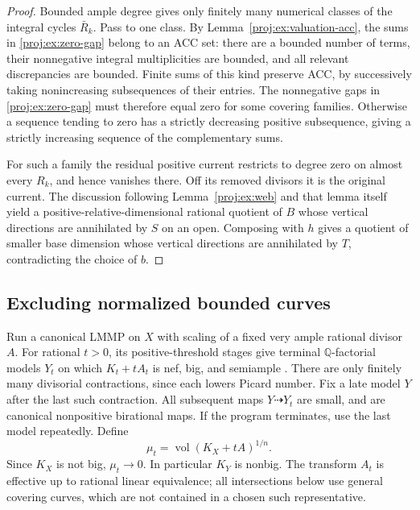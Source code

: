 \documentclass[11pt,letterpaper]{article}
\theoremstyle{definition}
\theoremstyle{remark}
\begin{document}
\begin{proof}
Bounded ample degree gives only finitely many numerical
classes of the integral cycles \(\bar R_k\). Pass to one
class. By Lemma~\ref{proj:ex:valuation-acc}, the sums in
\eqref{proj:ex:zero-gap} belong to an ACC set: there are a bounded
number of terms, their nonnegative integral multiplicities
are bounded, and all relevant discrepancies are bounded.
Finite sums of this kind preserve ACC, by successively
taking nonincreasing subsequences of their entries.
The nonnegative gaps in \eqref{proj:ex:zero-gap} must therefore
equal zero for some covering families. Otherwise a sequence
tending to zero has a strictly decreasing positive
subsequence, giving a strictly increasing sequence of the
complementary sums.

For such a family the residual positive current restricts
to degree zero on almost every \(R_k\), and hence vanishes
there. Off its removed divisors it is the original current.
The discussion following Lemma~\ref{proj:ex:web} and that lemma
itself yield a positive-relative-dimensional rational
quotient of \(B\) whose vertical directions are annihilated
by \(S\) on an open. Composing with \(h\) gives a quotient
of smaller base dimension whose vertical directions are
annihilated by \(T\), contradicting the choice of \(b\).
\end{proof}

\subsection{Excluding normalized bounded curves}

Run a canonical LMMP on \(X\) with scaling of a fixed very ample
rational divisor \(A\). For rational \(t>0\), its positive-threshold
stages give terminal \(\mathbb{Q}\)-factorial models \(Y_t\) on which
\(K_t+tA_t\) is nef, big, and semiample
\cite{BCHM}. There are only finitely many divisorial
contractions, since each lowers Picard number. Fix a late model
\(Y\) after the last such contraction. All subsequent maps
\(Y\dashrightarrow Y_t\) are small, and are canonical
nonpositive birational maps. If the program terminates, use
the last model repeatedly. Define
\begin{equation}\label{proj:ex:volume-scale}
 \mu_t=\operatorname{vol}(K_X+tA)^{1/n}.
\end{equation}
Since \(K_X\) is not big, \(\mu_t\to0\). In particular \(K_Y\)
is nonbig. The transform \(A_t\) is effective up to rational
linear equivalence; all intersections below use general
covering curves, which are not contained in a chosen such
representative.
\end{document}
